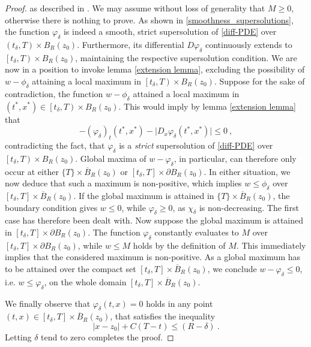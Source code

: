 \begin{theorem}
\begin{proof}
				as described in \cite[p.~73]{barles}. We may assume without loss of generality that $ M \geq 0 $, otherwise there is nothing to prove. As shown in \ref{smoothness_supersolutions}, the function $ \varphi_{\delta} $ is indeed a smooth, strict supersolution of \eqref{diff-PDE} over $ \left(t_{\delta}, T \right) \times B_R(z_0) $. Furthermore, its differential $ D \varphi_{\delta} $ continuously extends to $ \left[t_{\delta}, T \right) \times B_R(z_0) $, maintaining the respective supersolution condition. We are now in a position to invoke lemma \ref{extension lemma}, excluding the possibility of $ w - \phi_{\delta} $ attaining a local maximum in $ \left[t_{\delta}, T \right) \times B_R (z_0) $. Suppose for the sake of contradiction, the function $ w - \phi_{\delta} $ attained a local maximum in $ (t^{*}, x^{*}) \in \left[t_{\delta}, T \right) \times B_R (z_0) $. This would imply by lemma \ref{extension lemma} that
				\begin{equation*}
					-(\varphi_{\delta})_t(t^*, x^*) - \lvert D_x \varphi_{\delta}(t^*, x^*) \rvert \leq 0 \ ,
				\end{equation*}
				contradicting the fact, that $ \varphi_{\delta} $ is a \emph{strict} supersolution of \eqref{diff-PDE} over $ \left[t_{\delta}, T \right) \times B_R (z_0) $.
				Global maxima of $ w - \varphi_{\delta} $, in particular, can therefore only occur at either $ \{T\} \times \overline{B}_R (z_0) $ or $ \left[t_{\delta}, T\right] \times \partial B_R(z_0) $. In either situation, we now deduce that such a maximum is non-positive, which implies $ w \leq \phi_{\delta} $ over $  \left[ t_{\delta}, T \right] \times \overline{B}_R (z_0) $. If the global maximum is attained in $ \{T\} \times \overline{B}_R (z_0) $, the boundary condition gives $ w \leq 0 $, while $ \varphi_{\delta} \geq 0 $, as $ \chi_{\delta} $ is non-decreasing. The first case has therefore been dealt with. Now suppose the global maximum is attained in $ \left[t_{\delta}, T\right] \times \partial B_R(z_0) $. The function $ \varphi_{\delta} $ constantly evaluates to $ M $ over $ \left[t_{\delta}, T\right] \times \partial B_R(z_0) $, while $ w \leq M $ holds by the definition of $ M $. This immediately implies that the considered maximum is non-positive. As a global maximum has to be attained over the compact set $ \left[t_{\delta}, T\right] \times \overline{B}_R (z_0)$, we conclude $ w - \varphi_{\delta} \leq 0$, i.e. $ w \leq \varphi_{\delta} $, on the whole domain $ \left[t_{\delta}, T\right] \times \overline{B}_R (z_0) $.
				
				We finally observe that $ \varphi_{\delta}(t, x) = 0 $ holds in any point $ (t, x) \in \left[t_{\delta}, T\right] \times \overline{B}_R(z_0)$, that satisfies the inequality
				\begin{equation*}
					\lvert x - z_0 \rvert + C(T - t) \leq (R - \delta) \ .
				\end{equation*}
				Letting $ \delta $ tend to zero completes the proof.
			\end{proof}
		\end{theorem}